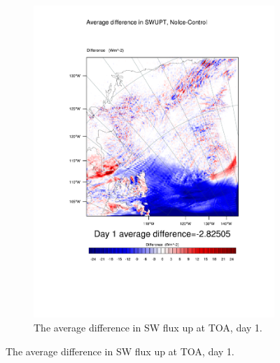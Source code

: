 \begin{figure}
\begin{subfigure}{0.48\textwidth}
		\includegraphics[width=\textwidth]{results/noice/diff_NoIce_SWUPT_Day1.pdf}
		\caption{The average difference in SW flux up at TOA, day 1.}
		\label{subfig:swup_r2Day1}
	\end{subfigure}
	

\end{figure}
